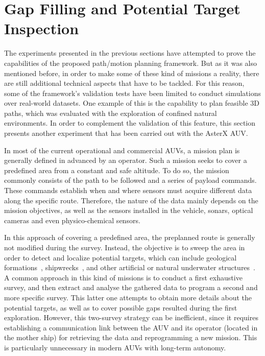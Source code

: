 \section{Gap Filling and Potential Target Inspection}

The experiments presented in the previous sections have attempted to prove the
capabilities of the proposed path/motion planning framework. But as it was also
mentioned before, in order to make some of these kind of missions a reality,
there are still additional technical aspects that have to be tackled. For this
reason, some of the framework's validation tests have been limited to conduct
simulations over real-world datasets. One example of this is the capability to
plan feasible \ac{3D} paths, which was evaluated with the exploration of
confined natural environments. In order to complement the validation of this
feature, this section presents another experiment that has been carried out with
the AsterX \ac{AUV}.

In most of the current operational and commercial \acp{AUV}, a mission plan is
generally defined in advanced by an operator. Such a mission seeks to cover a
predefined area from a constant and safe altitude. To do so, the mission
commonly consists of the path to be followed and a series of payload commands.
These commands establish when and where sensors must acquire different data
along the specific route. Therefore, the nature of the data mainly depends on
the mission objectives, as well as the sensors installed in the vehicle, \eg
sonars, optical cameras and even physico-chemical sensors.

In this approach of covering a predefined area, the preplanned route is
generally not modified during the survey. Instead, the objective is to sweep the
area in order to detect and localize potential targets, which can include
geological formations~\cite{Galceran2012}, shipwrecks~\cite{Gracias2013}, and
other artificial or natural underwater structures~\cite{Escartin2013}. A common
approach in this kind of missions is to conduct a first exhaustive survey, and
then extract and analyse the gathered data to program a second and more specific
survey. This latter one attempts to obtain more details about the potential
targets, as well as to cover possible gaps resulted during the first
exploration. However, this two-survey strategy can be inefficient, since it
requires establishing a communication link between the \ac{AUV} and its operator
(located in the mother ship) for retrieving the data and reprogramming a new
mission. This is particularly unnecessary in modern \acp{AUV} with long-term
autonomy.

